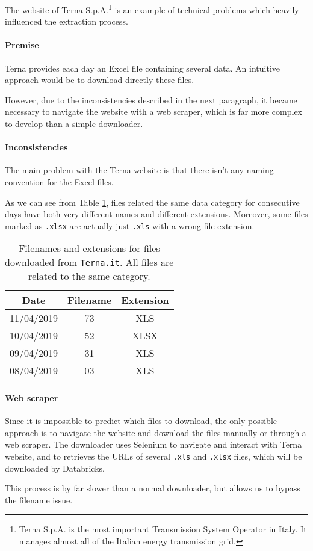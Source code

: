 The website of Terna S.p.A.\footnote{
    Terna S.p.A. is the most important Transmission System Operator in Italy.
    It manages almost all of the Italian energy transmission grid.
} is an example of technical problems which heavily influenced the extraction process.

\paragraph{Premise}
    Terna provides each day an Excel file containing several data.
    An intuitive approach would be to download directly these files.
    
    However, due to the inconsistencies described in the next paragraph, it became necessary to navigate the website with a web scraper, which is far more complex to develop than a simple downloader.
    
\paragraph{Inconsistencies}
    The main problem with the Terna website is that there isn't any naming convention for the Excel files.
    
    As we can see from Table \ref{tab:etl:terna:files}, files related the same data category for consecutive days have both very different names and different extensions.
    Moreover, some files marked as \texttt{.xlsx} are actually just \texttt{.xls} with a wrong file extension.
    
    \begin{table}
        \centering
        \begin{tabular}{|c c c|}
            \toprule
            Date & Filename & Extension \\
            \midrule
            11/04/2019 & 73 & XLS  \\
            10/04/2019 & 52 & XLSX \\
            09/04/2019 & 31 & XLS  \\
            08/04/2019 & 03 & XLS  \\
            \bottomrule
        \end{tabular}
        \caption{
            Filenames and extensions for files downloaded from \texttt{Terna.it}.
            All files are related to the same category.
        }
        \label{tab:etl:terna:files}
    \end{table}
    
  \paragraph{Web scraper}
    Since it is impossible to predict which files to download, the only possible approach is to navigate the website and download the files manually or through a web scraper.
    The downloader uses Selenium to navigate and interact with Terna website, and to retrieves the URLs of several \texttt{.xls} and \texttt{.xlsx} files, which will be downloaded by Databricks.
    
    This process is by far slower than a normal downloader, but allows us to bypass the filename issue.